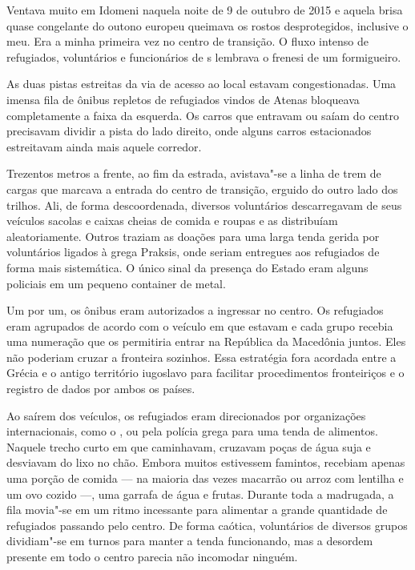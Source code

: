 \putodd{}
\clearpage

 

Ventava muito em Idomeni naquela noite de 9 de outubro de 2015 e aquela
brisa quase congelante do outono europeu queimava os rostos desprotegidos, inclusive o meu.
% 
% 
%
%
Era a minha primeira vez no centro de transição. O fluxo intenso de refugiados, voluntários e funcionários de
s lembrava o frenesi de um formigueiro.

As duas pistas estreitas da via de acesso ao local estavam
congestionadas. Uma imensa fila de ônibus repletos de refugiados vindos
de Atenas bloqueava completamente a faixa da esquerda. Os carros que
entravam ou saíam do centro precisavam dividir a pista do lado direito,
onde alguns carros estacionados estreitavam ainda mais aquele corredor.

Trezentos metros a frente, ao fim da estrada, avistava"-se a linha de
trem de cargas que marcava a entrada do centro de transição, erguido do
outro lado dos trilhos. Ali, de forma descoordenada, diversos
voluntários descarregavam de seus veículos sacolas e caixas cheias de
comida e roupas e as distribuíam aleatoriamente. Outros traziam as
doações para uma larga tenda gerida por voluntários ligados à  grega
Praksis, onde seriam entregues aos refugiados de forma mais sistemática.
O único sinal da presença do Estado eram alguns policiais em um pequeno
container de metal.

Um por um, os ônibus eram autorizados a ingressar no centro. Os
refugiados eram agrupados de acordo com o veículo em que estavam e cada grupo recebia uma numeração que os
permitiria entrar na República da Macedônia juntos. Eles não poderiam
cruzar a fronteira sozinhos. Essa estratégia fora acordada entre a
Grécia e o antigo território iugoslavo para facilitar procedimentos
fronteiriços e o registro de dados por ambos os países.

Ao saírem dos veículos, os refugiados eram direcionados por organizações
internacionais, como o , ou pela polícia grega para uma tenda de
alimentos. Naquele trecho curto em que caminhavam, cruzavam poças
de água suja e desviavam do lixo no chão. Embora muitos estivessem
famintos, recebiam apenas uma porção de comida --- na maioria das
vezes macarrão ou arroz com lentilha e um ovo cozido \mbox{---,} uma garrafa de
água e frutas. Durante toda a madrugada, a fila movia"-se em um ritmo
incessante para alimentar a grande quantidade de refugiados passando
pelo centro. De forma caótica, voluntários de diversos grupos
dividiam"-se em turnos para manter a tenda funcionando, mas a desordem 
presente em todo o centro parecia não incomodar ninguém.

